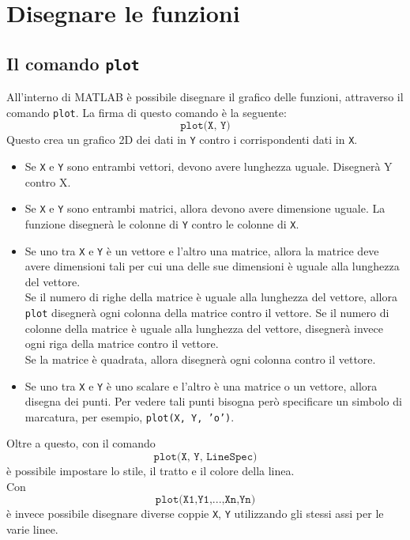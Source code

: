 \chapter{Disegnare le funzioni}

\section{Il comando \texttt{plot}}
All'interno di MATLAB è possibile disegnare il grafico delle funzioni, attraverso il comando \texttt{plot}.
La firma di questo comando è la seguente:
$$ \texttt{plot(X, Y)} $$
Questo crea un grafico 2D dei dati in \texttt{Y} contro i corrispondenti dati in \texttt{X}.
\begin{itemize}
	\item 	Se \texttt{X} e \texttt{Y} sono entrambi vettori, devono avere lunghezza uguale. Disegnerà Y contro X.
	\item	Se \texttt{X} e \texttt{Y} sono entrambi matrici, allora devono avere dimensione uguale. La funzione
			disegnerà le colonne di \texttt{Y} contro le colonne di \texttt{X}.
	\item	Se uno tra \texttt{X} e \texttt{Y} è un vettore e l'altro una matrice, allora la matrice deve avere
			dimensioni tali per cui una delle sue dimensioni è uguale alla lunghezza del vettore. \\
			Se il numero di righe della matrice è uguale alla lunghezza del vettore, allora \texttt{plot} 
			disegnerà ogni colonna della matrice contro il vettore. Se il numero di colonne della matrice è uguale
			alla lunghezza del vettore, disegnerà invece ogni riga della matrice contro il vettore. \\
			Se la matrice è quadrata, allora disegnerà ogni colonna contro il vettore.
	\item	Se uno tra \texttt{X} e \texttt{Y} è uno scalare e l'altro è una matrice o un vettore, allora disegna
			dei punti. Per vedere tali punti bisogna però specificare un simbolo di marcatura, per esempio,
			\texttt{plot(X, Y, 'o')}.
\end{itemize}

Oltre a questo, con il comando $$\texttt{plot(X, Y, LineSpec)}$$ è possibile impostare lo stile, il tratto e il 
colore della linea. \break \\
Con $$\texttt{plot(X1,Y1,...,Xn,Yn)}$$ è invece possibile disegnare diverse coppie \texttt{X}, \texttt{Y} utilizzando 
gli stessi assi per le varie linee. \break \\

